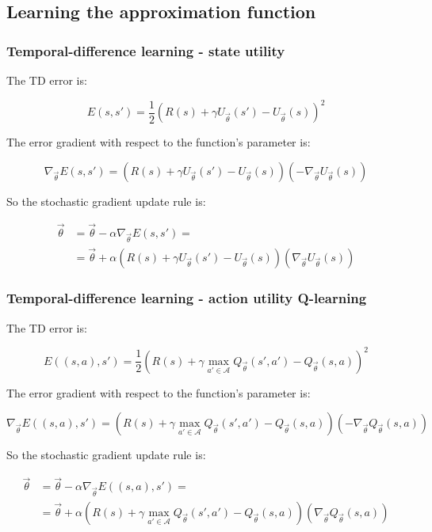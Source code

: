 	\subsection{Learning the approximation function}

		\subsubsection{Temporal-difference learning - state utility}
		The TD error is:

		$$E(s,s') = \frac{1}{2}(R(s) + \gamma U_{\vec{\theta}}(s')-U_{\vec{\theta}}(s))^2$$

		The error gradient with respect to the function's parameter is:

		$$\nabla_{\vec{\theta}} E(s,s') = (R(s) + \gamma U_{\vec{\theta}}(s') - U_{\vec{\theta}}(s))(-\nabla_{\vec{\theta}}U_{\vec{\theta}}(s))$$

		So the stochastic gradient update rule is:

		\begin{align*}
			\vec{\theta} &= \vec{\theta} - \alpha\nabla_{\vec{\theta}}E(s,s') = \\
				     &= \vec{\theta} + \alpha(R(s) + \gamma U_{\vec{\theta}}(s') - U_{\vec{\theta}}(s))(\nabla_{\vec{\theta}}U_{\vec{\theta}}(s))
		\end{align*}

		\subsubsection{Temporal-difference learning - action utility Q-learning}
		The TD error is:

		$$E((s,a),s') = \frac{1}{2}(R(s) + \gamma\max\limits_{a'\in\mathcal{A}}Q_{\vec{\theta}}(s',a')-Q_{\vec{\theta}}(s,a))^2$$

		The error gradient with respect to the function's parameter is:

		$$\nabla_{\vec{\theta}} E((s,a),s') = (R(s) + \gamma\max\limits_{a'\in\mathcal{A}}Q_{\vec{\theta}}(s',a') - Q_{\vec{\theta}}(s,a))(-\nabla_{\vec{\theta}}Q_{\vec{\theta}}(s,a))$$

		So the stochastic gradient update rule is:

		\begin{align*}
			\vec{\theta} &= \vec{\theta} - \alpha\nabla_{\vec{\theta}}E((s,a),s') = \\
				     &= \vec{\theta} + \alpha(R(s) + \gamma\max\limits_{a'\in\mathcal{A}}Q_{\vec{\theta}}(s',a') - Q_{\vec{\theta}}(s,a))(\nabla_{\vec{\theta}}Q_{\vec{\theta}}(s,a))
		\end{align*}
